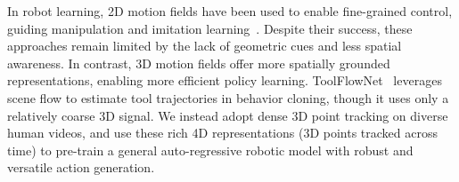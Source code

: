 In robot learning, 2D motion fields have been used to enable fine-grained control, guiding manipulation and imitation learning~\cite{goyalIFORIterativeFlow2022, vecerikRoboTAPTrackingArbitrary2023, gu_rt-trajectory_2023, yuanRoboPointVisionLanguageModel2024, 
 zheng2024tracevlavisualtraceprompting, bharadhwajTrack2ActPredictingPoint2024, xu2024flowcrossdomainmanipulationinterface}. 
Despite their success, these approaches remain limited by the lack of geometric cues and less spatial awareness. 
In contrast, 3D motion fields offer more spatially grounded representations, enabling more efficient policy learning.
ToolFlowNet~\cite{seita_toolflownet_2022} leverages scene flow to estimate tool trajectories in behavior cloning, though it uses only a relatively coarse 3D signal.
We instead adopt dense 3D point tracking on diverse human videos, and use these rich 4D representations (3D points tracked across time) to pre-train a general auto-regressive robotic model with robust and versatile action generation.




